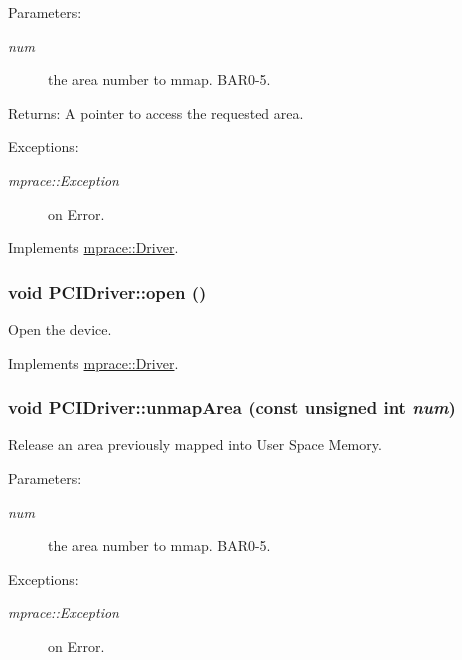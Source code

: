 \begin{Desc}
\item[Parameters:]
\begin{description}
\item[{\em num}]the area number to mmap. BAR0-5. \end{description}
\end{Desc}
\begin{Desc}
\item[Returns:]A pointer to access the requested area. \end{Desc}
\begin{Desc}
\item[Exceptions:]
\begin{description}
\item[{\em mprace::Exception}]on Error.\end{description}
\end{Desc}


Implements \hyperlink{classmprace_1_1Driver_a3}{mprace::Driver}.\hypertarget{classmprace_1_1PCIDriver_a2}{
\subsubsection[open]{\setlength{\rightskip}{0pt plus 5cm}void PCIDriver::open ()}}
\label{classmprace_1_1PCIDriver_a2}


Open the device. 



Implements \hyperlink{classmprace_1_1Driver_a1}{mprace::Driver}.\hypertarget{classmprace_1_1PCIDriver_a5}{
\subsubsection[unmapArea]{\setlength{\rightskip}{0pt plus 5cm}void PCIDriver::unmap\-Area (const unsigned int {\em num})}}
\label{classmprace_1_1PCIDriver_a5}


Release an area previously mapped into User Space Memory. 

\begin{Desc}
\item[Parameters:]
\begin{description}
\item[{\em num}]the area number to mmap. BAR0-5. \end{description}
\end{Desc}
\begin{Desc}
\item[Exceptions:]
\begin{description}
\item[{\em mprace::Exception}]on Error.\end{description}
\end{Desc}



